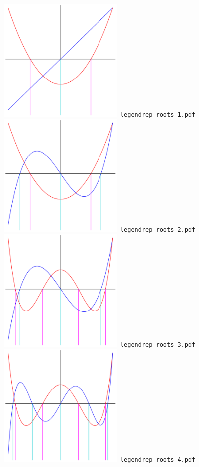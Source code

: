 \documentclass[a4paper]{amsart}
\begin{document}
\includegraphics[width=6cm]{legendrep_roots_1.pdf}\verb+ legendrep_roots_1.pdf+\\
\includegraphics[width=6cm]{legendrep_roots_2.pdf}\verb+ legendrep_roots_2.pdf+\\
\includegraphics[width=6cm]{legendrep_roots_3.pdf}\verb+ legendrep_roots_3.pdf+\\
\includegraphics[width=6cm]{legendrep_roots_4.pdf}\verb+ legendrep_roots_4.pdf+\\
\end{document}
